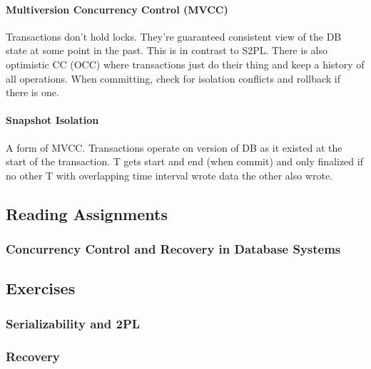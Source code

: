 \paragraph{Multiversion Concurrency Control (MVCC)}
Transactions don't hold locks. They're guaranteed consistent view of the DB state at some point in the past. This is in contrast to S2PL. There is also optimistic CC (OCC) where transactions just do their thing and keep a history of all operations. When committing, check for isolation conflicts and rollback if there is one.

\paragraph{Snapshot Isolation}
A form of MVCC. Transactions operate on version of DB as it existed at the start of the transaction. T gets start and end (when commit) and only finalized if no other T with overlapping time interval wrote data the other also wrote.




\subsection{Reading Assignments}

\subsubsection{Concurrency Control and Recovery in Database Systems}

\subsection{Exercises}

\subsubsection{Serializability and 2PL}

\subsubsection{Recovery}
